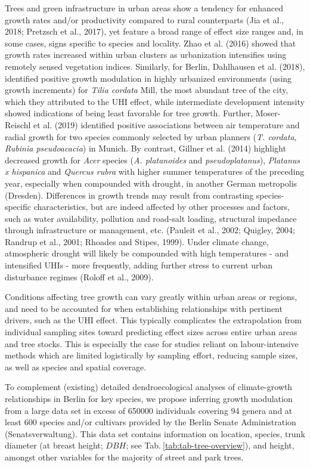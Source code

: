 \documentclass[
]{article}
\begin{document}
Trees and green infrastructure in urban areas show a tendency for enhanced growth rates and/or productivity compared to rural counterparts (Jia et al., 2018; Pretzsch et al., 2017), yet feature a broad range of effect size ranges and, in some cases, signs specific to species and locality.
Zhao et al. (2016) showed that growth rates increased within urban clusters as urbanization intensifies using remotely sensed vegetation indices.
Similarly, for Berlin, Dahlhausen et al. (2018), identified positive growth modulation in highly urbanized environments (using growth increments) for \emph{Tilia cordata} Mill, the most abundant tree of the city, which they attributed to the UHI effect, while intermediate development intensity showed indications of being least favorable for tree growth.
Further, Moser-Reischl et al. (2019) identified positive associations between air temperature and radial growth for two species commonly selected by urban planners (\emph{T. cordata}, \emph{Rubinia pseudoacacia}) in Munich.
By contrast, Gillner et al. (2014) highlight decreased growth for \emph{Acer} species (\emph{A. platanoides} and \emph{pseudoplatanus}), \emph{Platanus x hispanica} and \emph{Quercus rubra} with higher summer temperatures of the preceding year, especially when compounded with drought, in another German metropolis (Dresden).
Differences in growth trends may result from contrasting species-specific characteristics, but are indeed affected by other processes and factors, such as water availability, pollution and road-salt loading, structural impedance through infrastructure or management, etc. (Pauleit et al., 2002; Quigley, 2004; Randrup et al., 2001; Rhoades and Stipes, 1999).
Under climate change, atmospheric drought will likely be compounded with high temperatures - and intensified UHIs - more frequently, adding further stress to current urban disturbance regimes (Roloff et al., 2009).

Conditions affecting tree growth can vary greatly within urban areas or regions, and need to be accounted for when establishing relationships with pertinent drivers, such as the UHI effect.
This typically complicates the extrapolation from individual sampling sites toward predicting effect sizes across entire urban areas and tree stocks.
This is especially the case for studies reliant on labour-intensive methods which are limited logistically by sampling effort, reducing sample sizes, as well as species and spatial coverage.

To complement (existing) detailed dendroecological analyses of climate-growth relationships in Berlin for key species, we propose inferring growth modulation from a large data set in excess of 650000 individuals covering 94 genera and at least 600 species and/or cultivars provided by the Berlin Senate Administration (Senatsverwaltung).
This data set contains information on location, species, trunk diameter (at breast height; \(DBH\); see Tab.\(~\)\ref{tab:tab-tree-overview}), and height, amongst other variables for the majority of street and park trees.
\end{document}
